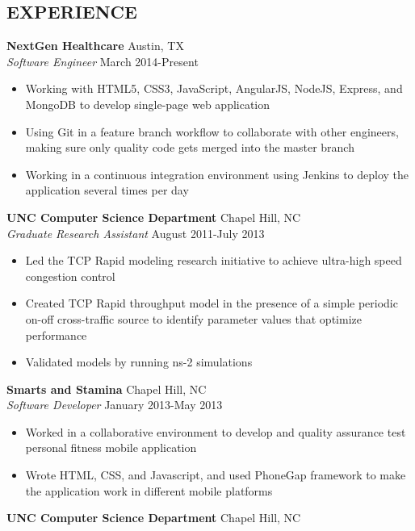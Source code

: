 \documentclass[line,margin,letterpaper]{res}
\begin{document}
\begin{resume}
\section{EXPERIENCE}
  {\bf NextGen Healthcare} \hfill Austin, TX \\
  \emph{Software Engineer} \hfill March 2014-Present
  \begin{itemize} \itemsep -2pt
    \item Working with HTML5, CSS3, JavaScript, AngularJS, NodeJS, Express, and
    MongoDB to develop single-page web application
    \item Using Git in a feature branch workflow to collaborate with other
    engineers, making sure only quality code gets merged into the master branch
    \item Working in a continuous integration environment using Jenkins to
    deploy the application several times per day
  \end{itemize}
  {\bf UNC Computer Science Department} \hfill Chapel Hill, NC \\
  \emph{Graduate Research Assistant} \hfill August 2011-July 2013
  \begin{itemize} \itemsep -2pt
    \item Led the TCP Rapid modeling research initiative to achieve 
    ultra-high speed congestion control
    \item Created TCP Rapid throughput model in the presence of a simple 
    periodic on-off cross-traffic source to identify parameter values that 
    optimize performance
    \item Validated models by running ns-2 simulations
  \end{itemize}
  {\bf Smarts and Stamina} \hfill Chapel Hill, NC \\
  \emph{Software Developer} \hfill January 2013-May 2013
  \begin{itemize} \itemsep -2pt
    \item Worked in a collaborative environment to develop and quality 
    assurance test personal fitness mobile application
    \item Wrote HTML, CSS, and Javascript, and used PhoneGap framework to make 
    the application work in different mobile platforms
  \end{itemize}
  {\bf UNC Computer Science Department} 
  \hfill Chapel Hill, NC \\

\end{resume}
\end{document}
